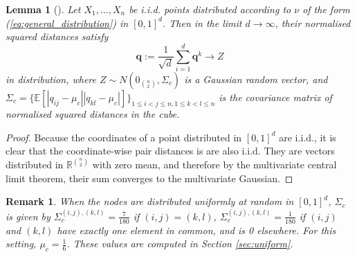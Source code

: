 \documentclass{article}
\newtheorem{lemma}{Lemma}
\newtheorem{remark}{Remark}
\newcommand{\tti}{\rightarrow\infty}
\begin{document}
\begin{lemma}[\cite{erba2020random}]
    \label{thm:cube_clt}
    Let $X_1,...,X_n$ be i.i.d. points distributed according to $\nu$ of the form (\ref{eq:general_distribution}) in $[0,1]^d$. Then in the limit $d\tti$, their  normalised squared distances  satisfy
    \begin{equation}
        \boldsymbol{q} := \frac{1}{\sqrt{d}} \sum_{i=1}^d \boldsymbol{q}^k \rightarrow Z
    \end{equation}
    in distribution, where $Z \sim N(0_{\binom{n}{2}}, \Sigma_c)$ is a Gaussian random vector, and $\Sigma_c = \{\mathbb{E}[|q_{ij}-\mu_c||q_{kl}-\mu_c|]\}_{1\leq i<j\leq n, 1\leq k<l \leq n}$ is the covariance matrix of  normalised squared distances  in the cube.
\end{lemma}

\begin{proof}
    Because the coordinates of a point distributed in $[0,1]^d$ are i.i.d., it is clear that the coordinate-wise pair distances is are also i.i.d. They are vectors distributed in $\mathbb{R}^{\binom{n}{2}}$ with zero mean, and therefore by the multivariate central limit theorem, their sum converges to the multivariate Gaussian. 
\end{proof}

\begin{remark}
    When the nodes are distributed uniformly at random in $[0,1]^d$, $\Sigma_c$ is given by $\Sigma_c^{(i,j),(k,l)} = \frac{7}{180}$ if $(i,j) = (k,l)$, $\Sigma_c^{(i,j),(k,l)} = \frac{1}{180}$ if $(i,j)$ and $(k,l)$ have exactly one element in common, and is 0 elsewhere. For this setting, $\mu_c=\frac{1}{6}$. These values are computed in Section \ref{sec:uniform}.
\end{remark}
\end{document}
